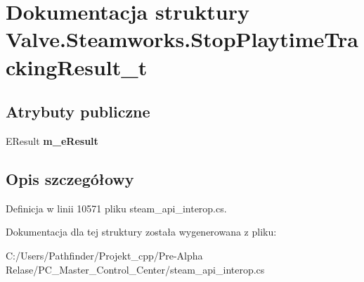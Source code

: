 \hypertarget{struct_valve_1_1_steamworks_1_1_stop_playtime_tracking_result__t}{}\section{Dokumentacja struktury Valve.\+Steamworks.\+Stop\+Playtime\+Tracking\+Result\+\_\+t}
\label{struct_valve_1_1_steamworks_1_1_stop_playtime_tracking_result__t}
\subsection*{Atrybuty publiczne}
\begin{DoxyCompactItemize}
\item 
\mbox{\label{struct_valve_1_1_steamworks_1_1_stop_playtime_tracking_result__t_a06b62e06e599ad6e1bdd48dda5e41d78}} 
E\+Result {\bfseries m\+\_\+e\+Result}
\end{DoxyCompactItemize}


\subsection{Opis szczegółowy}


Definicja w linii 10571 pliku steam\+\_\+api\+\_\+interop.\+cs.



Dokumentacja dla tej struktury została wygenerowana z pliku\+:\begin{DoxyCompactItemize}
\item 
C\+:/\+Users/\+Pathfinder/\+Projekt\+\_\+cpp/\+Pre-\/\+Alpha Relase/\+P\+C\+\_\+\+Master\+\_\+\+Control\+\_\+\+Center/steam\+\_\+api\+\_\+interop.\+cs\end{DoxyCompactItemize}

